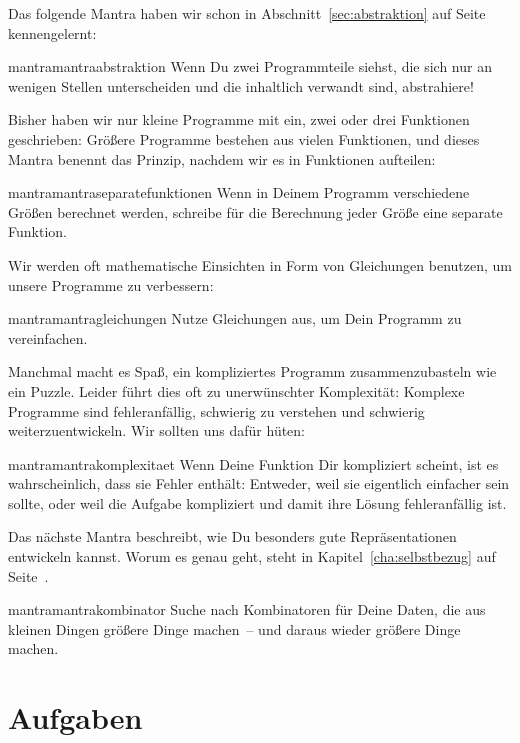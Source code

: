 Das folgende Mantra haben wir schon in Abschnitt~\ref{sec:abstraktion}
auf Seite~\pageref{sec:abstraktion} kennengelernt:
%
\begin{restatable}{mantra}{mantraabstraktion}
  \label{mantra:abstraktion}
  Wenn Du zwei Programmteile siehst, die sich nur an wenigen Stellen
  unterscheiden und die inhaltlich verwandt sind, abstrahiere!
\end{restatable}
%
\noindent Bisher haben wir nur kleine Programme mit ein, zwei oder drei
Funktionen geschrieben: Größere Programme bestehen aus vielen
Funktionen, und dieses Mantra benennt das Prinzip, nachdem wir es in
Funktionen aufteilen:
%
\begin{restatable}{mantra}{mantraseparatefunktionen}
  \label{mantra:separate-funktionen}
  Wenn in Deinem Programm verschiedene Größen berechnet werden,
  schreibe für die Berechnung jeder Größe eine separate Funktion.
\end{restatable}
%
\noindent Wir werden oft mathematische Einsichten in Form von Gleichungen
benutzen, um unsere Programme zu verbessern:
%
\begin{restatable}{mantra}{mantragleichungen}
  \label{mantra:gleichungen}
  Nutze Gleichungen aus, um Dein Programm zu vereinfachen.
\end{restatable}
%
\noindent Manchmal macht es Spaß, ein kompliziertes Programm zusammenzubasteln
wie ein Puzzle.  Leider führt dies oft zu unerwünschter Komplexität:
Komplexe Programme sind fehleranfällig, schwierig zu verstehen und
schwierig weiterzuentwickeln.  Wir sollten uns dafür hüten:
%
\begin{restatable}{mantra}{mantrakomplexitaet}
  \label{mantra:komplexitaet}
  Wenn Deine Funktion Dir kompliziert scheint, ist es wahrscheinlich,
  dass sie Fehler enthält: Entweder, weil sie eigentlich einfacher
  sein sollte, oder weil die Aufgabe kompliziert und damit ihre Lösung
  fehleranfällig ist.
\end{restatable}
%
Das nächste Mantra beschreibt, wie Du besonders gute Repräsentationen
entwickeln kannst.  Worum es genau geht, steht in
Kapitel~\ref{cha:selbstbezug} auf Seite~\pageref{cha:selbstbezug}.
%
\begin{restatable}{mantra}{mantrakombinator}
  \label{mantra:kombinator}
  Suche nach Kombinatoren für Deine Daten, die aus
  kleinen Dingen größere Dinge machen~-- und daraus wieder größere
  Dinge machen.
\end{restatable}

\section*{Aufgaben}

